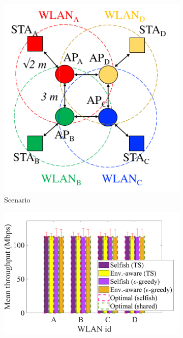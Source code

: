 \documentclass[preprint,12pt]{elsarticle}
\begin{document}
\begin{figure}[h!]
	\centering
	\begin{subfigure}[b]{0.26\textwidth}
		\includegraphics[width=\textwidth]{s5_new}
		\caption{Scenario}
		\label{fig:selfish_s1}
	\end{subfigure}
	\begin{subfigure}[b]{0.36\textwidth}
		\includegraphics[width=\textwidth]{fig_2_2_potential}

\end{subfigure}
\end{figure}
\end{document}
